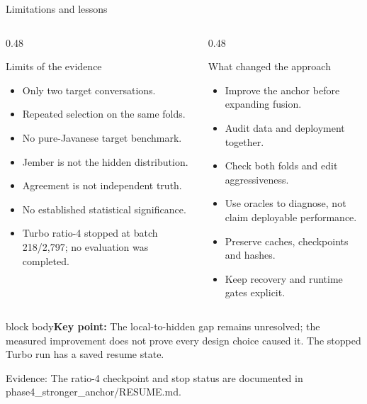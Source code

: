\documentclass[aspectratio=169,11pt]{beamer}
\newcommand{\takeaway}[1]{\vfill\begin{beamercolorbox}[sep=2mm,wd=\linewidth]{block body}\small\textbf{Key point:} #1\end{beamercolorbox}}
\newcommand{\evidence}[1]{\vspace{1mm}\par{\tiny\color{slate}Evidence: #1\par}}
\begin{document}
\begin{frame}{Limitations and lessons}
\begin{columns}[T]
\begin{column}{0.48\textwidth}
\begin{alertblock}{Limits of the evidence}
\begin{itemize}\item Only two target conversations.
\item Repeated selection on the same folds.
\item No pure-Javanese target benchmark.
\item Jember is not the hidden distribution.
\item Agreement is not independent truth.
\item No established statistical significance.
\item Turbo ratio-4 stopped at batch 218/2,797; no evaluation was completed.
\end{itemize}
\end{alertblock}
\end{column}
\begin{column}{0.48\textwidth}
\begin{block}{What changed the approach}
\begin{itemize}\item Improve the anchor before expanding fusion.
\item Audit data and deployment together.
\item Check both folds and edit aggressiveness.
\item Use oracles to diagnose, not claim deployable performance.
\item Preserve caches, checkpoints and hashes.
\item Keep recovery and runtime gates explicit.
\end{itemize}
\end{block}
\end{column}
\end{columns}
\takeaway{The local-to-hidden gap remains unresolved; the measured improvement does not prove every design choice caused it. The stopped Turbo run has a saved resume state.}
\evidence{The ratio-4 checkpoint and stop status are documented in phase4\_stronger\_anchor/RESUME.md.}
\end{frame}
\end{document}
